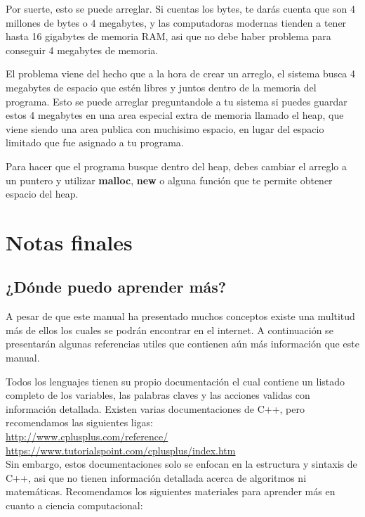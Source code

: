 \documentclass{article}
\begin{document}
Por suerte, esto se puede arreglar. Si cuentas los bytes, te darás cuenta que son 4 millones de bytes o 4 megabytes, y las computadoras modernas tienden a tener hasta 16 gigabytes de memoria RAM, asi que no debe haber problema para conseguir 4 megabytes de memoria.

El problema viene del hecho que a la hora de crear un arreglo, el sistema busca 4 megabytes de espacio que estén libres y juntos dentro de la memoria del programa. Esto se puede arreglar preguntandole a tu sistema si puedes guardar estos 4 megabytes en una area especial extra de memoria llamado el heap, que viene siendo una area publica con muchisimo espacio, en lugar del espacio limitado que fue asignado a tu programa.

Para hacer que el programa busque dentro del heap, debes cambiar el arreglo a un puntero y utilizar \textbf{malloc}, \textbf{new} o alguna función que te permite obtener espacio del heap.

\section{Notas finales}

\subsection{¿Dónde puedo aprender más?}

A pesar de que este manual ha presentado muchos conceptos existe una multitud más de ellos los cuales se podrán encontrar en el internet. A continuación se presentarán algunas referencias utiles que contienen aún más información que este manual.

Todos los lenguajes tienen su propio documentación el cual contiene un listado completo de los variables, las palabras claves y las acciones validas con información detallada. Existen varias documentaciones de C++, pero recomendamos las siguientes ligas: \\

\url{http://www.cplusplus.com/reference/} \\

\url{https://www.tutorialspoint.com/cplusplus/index.htm} \\

Sin embargo, estos documentaciones solo se enfocan en la estructura y sintaxis de C++, asi que no tienen información detallada acerca de algoritmos ni matemáticas. Recomendamos los siguientes materiales para aprender más en cuanto a ciencia computacional: \\
\end{document}
